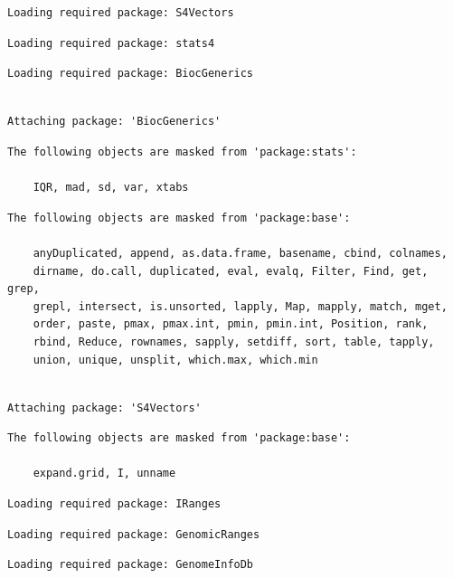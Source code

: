 \documentclass[
  letterpaper,
  DIV=11,
  numbers=noendperiod]{scrartcl}
\begin{document}
\begin{verbatim}
Loading required package: S4Vectors
\end{verbatim}

\begin{verbatim}
Loading required package: stats4
\end{verbatim}

\begin{verbatim}
Loading required package: BiocGenerics
\end{verbatim}

\begin{verbatim}

Attaching package: 'BiocGenerics'
\end{verbatim}

\begin{verbatim}
The following objects are masked from 'package:stats':

    IQR, mad, sd, var, xtabs
\end{verbatim}

\begin{verbatim}
The following objects are masked from 'package:base':

    anyDuplicated, append, as.data.frame, basename, cbind, colnames,
    dirname, do.call, duplicated, eval, evalq, Filter, Find, get, grep,
    grepl, intersect, is.unsorted, lapply, Map, mapply, match, mget,
    order, paste, pmax, pmax.int, pmin, pmin.int, Position, rank,
    rbind, Reduce, rownames, sapply, setdiff, sort, table, tapply,
    union, unique, unsplit, which.max, which.min
\end{verbatim}

\begin{verbatim}

Attaching package: 'S4Vectors'
\end{verbatim}

\begin{verbatim}
The following objects are masked from 'package:base':

    expand.grid, I, unname
\end{verbatim}

\begin{verbatim}
Loading required package: IRanges
\end{verbatim}

\begin{verbatim}
Loading required package: GenomicRanges
\end{verbatim}

\begin{verbatim}
Loading required package: GenomeInfoDb
\end{verbatim}
\end{document}

